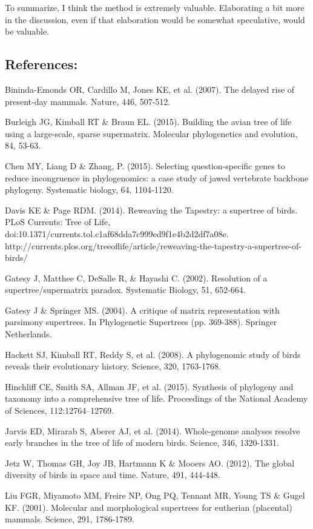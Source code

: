 \documentclass{article}
\begin{document}
To summarize, I think the method is extremely valuable. Elaborating a bit more in the discussion, even if that elaboration would be somewhat speculative, would be valuable.


\subsection*{References:}

Bininda-Emonds OR, Cardillo M, Jones KE, et al. (2007). The delayed rise of present-day mammals. Nature, 446, 507-512.

Burleigh JG, Kimball RT \& Braun EL. (2015). Building the avian tree of life using a large-scale, sparse supermatrix. Molecular phylogenetics and evolution, 84, 53-63.

Chen MY, Liang D \& Zhang, P. (2015). Selecting question-specific genes to reduce incongruence in phylogenomics: a case study of jawed vertebrate backbone phylogeny. Systematic biology, 64, 1104-1120.

Davis KE \& Page RDM. (2014). Reweaving the Tapestry: a supertree of birds. PLoS Currents: Tree of Life, doi:10.1371/currents.tol.c1af68dda7c999ed9f1e4b2d2df7a08e. http://currents.plos.org/treeoflife/article/reweaving-the-tapestry-a-supertree-of-birds/

Gatesy J, Matthee C, DeSalle R, \& Hayashi C. (2002). Resolution of a supertree/supermatrix paradox. Systematic Biology, 51, 652-664.

Gatesy J \& Springer MS. (2004). A critique of matrix representation with parsimony supertrees. In Phylogenetic Supertrees (pp. 369-388). Springer Netherlands.

Hackett SJ, Kimball RT, Reddy S, et al. (2008). A phylogenomic study of birds reveals their evolutionary history. Science, 320, 1763-1768.

Hinchliff CE, Smith SA, Allman JF, et al. (2015). Synthesis of phylogeny and taxonomy into a comprehensive tree of life. Proceedings of the National Academy of Sciences, 112:12764–12769.

Jarvis ED, Mirarab S, Aberer AJ, et al. (2014). Whole-genome analyses resolve early branches in the tree of life of modern birds. Science, 346, 1320-1331.

Jetz W, Thomas GH, Joy JB, Hartmann K \& Mooers AO. (2012). The global diversity of birds in space and time. Nature, 491, 444-448.

Liu FGR, Miyamoto MM, Freire NP, Ong PQ, Tennant MR, Young TS \& Gugel KF. (2001). Molecular and morphological supertrees for eutherian (placental) mammals. Science, 291, 1786-1789.
\end{document}
